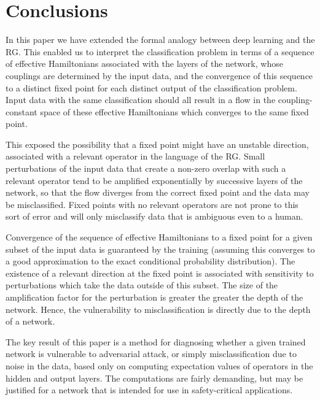 \documentclass[reprint,amsmath,amssymb,aps]{revtex4-1}
\begin{document}
\section{\label{sec:conclusions} Conclusions}

In this paper we have extended the formal analogy between deep learning and the RG. This enabled us to interpret the classification problem in terms of a sequence of effective Hamiltonians associated with the layers of the network, whose couplings are determined by the input data, and the convergence of this sequence to a distinct fixed point for each distinct output of the classification problem. Input data with the same classification should all result in a flow in the coupling-constant space of these effective Hamiltonians which converges to the same fixed point. 

This exposed the possibility that a fixed point might have an unstable direction, associated with a relevant operator in the language of the RG. Small perturbations of the input data that create a non-zero overlap with such a relevant operator tend to be amplified exponentially by successive layers of the network, so that the flow diverges from the correct fixed point and the data may be misclassified. Fixed points with no relevant operators are not prone to this sort of error and will only misclassify data that is ambiguous even to a human.

Convergence of the sequence of effective Hamiltonians to a fixed point for a given subset of the input data is guaranteed by the training (assuming this converges to a good approximation to the exact conditional probability distribution). The existence of a relevant direction at the fixed point is associated with sensitivity to perturbations which take the data outside of this subset. The size of the amplification factor for the perturbation is greater the greater the depth of the network. Hence, the vulnerability to misclassification is directly due to the depth of a network.

The key result of this paper is a method for diagnosing whether a given trained network is vulnerable to adversarial attack, or simply misclassification due to noise in the data, based only on computing expectation values of operators in the hidden and output layers. The computations are fairly demanding, but may be justified for a network that is intended for use in safety-critical applications.
\end{document}
